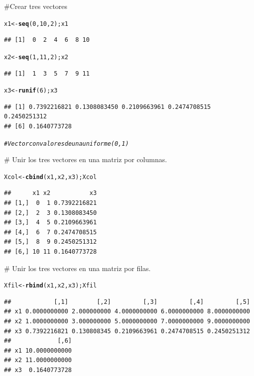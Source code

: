 \documentclass[12pt,letterpaper]{article}\usepackage[]{graphicx}\usepackage[]{color}
\makeatletter
\newcommand{\hlnum}[1]{\textcolor[rgb]{0.686,0.059,0.569}{#1}}%
\newcommand{\hlcom}[1]{\textcolor[rgb]{0.678,0.584,0.686}{\textit{#1}}}%
\newcommand{\hlstd}[1]{\textcolor[rgb]{0.345,0.345,0.345}{#1}}%
\newcommand{\hlkwb}[1]{\textcolor[rgb]{0.69,0.353,0.396}{#1}}%
\newcommand{\hlkwd}[1]{\textcolor[rgb]{0.737,0.353,0.396}{\textbf{#1}}}%
\newenvironment{kframe}{%
 \def\at@end@of@kframe{}%
 \ifinner\ifhmode%
  \def\at@end@of@kframe{\end{minipage}}%
  \begin{minipage}{\columnwidth}%
 \fi\fi%
 \def\FrameCommand##1{\hskip\@totalleftmargin \hskip-\fboxsep
 \colorbox{shadecolor}{##1}\hskip-\fboxsep
     \hskip-\linewidth \hskip-\@totalleftmargin \hskip\columnwidth}%
 \MakeFramed {\advance\hsize-\width
   \@totalleftmargin\z@ \linewidth\hsize
   \@setminipage}}%
 {\par\unskip\endMakeFramed%
 \at@end@of@kframe}
\newenvironment{knitrout}{}{} %
\makeatother
\begin{document}
#Crear tres vectores
\begin{knitrout}
\color{fgcolor}\begin{kframe}
\begin{alltt}
\hlstd{x1} \hlkwb{<-} \hlkwd{seq}\hlstd{(}\hlnum{0}\hlstd{,} \hlnum{10}\hlstd{,} \hlnum{2}\hlstd{); x1}
\end{alltt}
\begin{verbatim}
## [1]  0  2  4  6  8 10
\end{verbatim}
\begin{alltt}
\hlstd{x2} \hlkwb{<-} \hlkwd{seq}\hlstd{(}\hlnum{1}\hlstd{,} \hlnum{11}\hlstd{,} \hlnum{2}\hlstd{); x2}
\end{alltt}
\begin{verbatim}
## [1]  1  3  5  7  9 11
\end{verbatim}
\begin{alltt}
\hlstd{x3} \hlkwb{<-} \hlkwd{runif}\hlstd{(}\hlnum{6}\hlstd{); x3}
\end{alltt}
\begin{verbatim}
## [1] 0.7392216821 0.1308083450 0.2109663961 0.2474708515 0.2450251312
## [6] 0.1640773728
\end{verbatim}
\begin{alltt}
\hlcom{# Vector con valores de una uniforme(0,1)}
\end{alltt}
\end{kframe}
\end{knitrout}
# Unir los tres vectores en una matriz por columnas.
\begin{knitrout}
\color{fgcolor}\begin{kframe}
\begin{alltt}
\hlstd{Xcol} \hlkwb{<-} \hlkwd{cbind}\hlstd{(x1, x2, x3); Xcol}
\end{alltt}
\begin{verbatim}
##      x1 x2           x3
## [1,]  0  1 0.7392216821
## [2,]  2  3 0.1308083450
## [3,]  4  5 0.2109663961
## [4,]  6  7 0.2474708515
## [5,]  8  9 0.2450251312
## [6,] 10 11 0.1640773728
\end{verbatim}
\end{kframe}
\end{knitrout}
# Unir los tres vectores en una matriz por filas.
\begin{knitrout}
\color{fgcolor}\begin{kframe}
\begin{alltt}
\hlstd{Xfil} \hlkwb{<-} \hlkwd{rbind}\hlstd{(x1, x2, x3); Xfil}
\end{alltt}
\begin{verbatim}
##            [,1]        [,2]         [,3]         [,4]         [,5]
## x1 0.0000000000 2.000000000 4.0000000000 6.0000000000 8.0000000000
## x2 1.0000000000 3.000000000 5.0000000000 7.0000000000 9.0000000000
## x3 0.7392216821 0.130808345 0.2109663961 0.2474708515 0.2450251312
##             [,6]
## x1 10.0000000000
## x2 11.0000000000
## x3  0.1640773728
\end{verbatim}
\end{kframe}
\end{knitrout}
\end{document}
